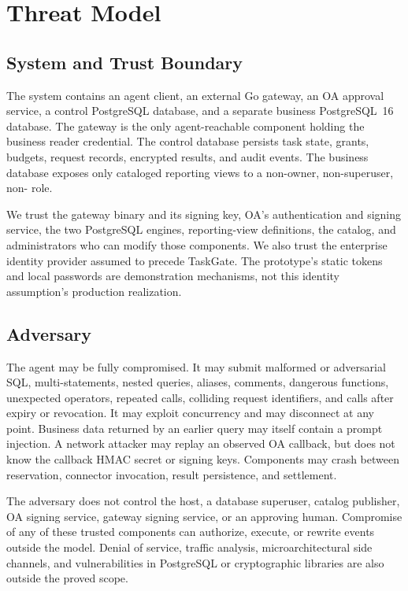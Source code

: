\documentclass[10pt,journal,compsoc]{IEEEtran}
\newcommand{\system}{TaskGate\xspace}
\newcommand{\code}[1]{\texttt{\detokenize{#1}}}
\begin{document}
\section{Threat Model}
\label{sec:threat}

\subsection{System and Trust Boundary}

The system contains an agent client, an external Go gateway, an OA approval
service, a control PostgreSQL database, and a separate business PostgreSQL~16
database.  The gateway is the only agent-reachable component holding the
business reader credential.  The control database persists task state, grants,
budgets, request records, encrypted results, and audit events.  The business
database exposes only cataloged reporting views to a non-owner,
non-superuser, non-\code{BYPASSRLS} role.

We trust the gateway binary and its signing key, OA's authentication and signing
service, the two PostgreSQL engines, reporting-view definitions, the catalog,
and administrators who can modify those components.  We also trust the
enterprise identity provider assumed to precede \system.  The prototype's
static tokens and local passwords are demonstration mechanisms, not this
identity assumption's production realization.

\subsection{Adversary}

The agent may be fully compromised.  It may submit malformed or adversarial
SQL, multi-statements, nested queries, aliases, comments, dangerous functions,
unexpected operators, repeated calls, colliding request identifiers, and calls
after expiry or revocation.  It may exploit concurrency and may disconnect at
any point.  Business data returned by an earlier query may itself contain a
prompt injection.  A network attacker may replay an observed OA callback, but
does not know the callback HMAC secret or signing keys.  Components may crash
between reservation, connector invocation, result persistence, and settlement.

The adversary does not control the host, a database superuser, catalog
publisher, OA signing service, gateway signing service, or an approving human.
Compromise of any of these trusted components can authorize, execute, or rewrite
events outside the model.  Denial of service, traffic analysis, microarchitectural
side channels, and vulnerabilities in PostgreSQL or cryptographic libraries are
also outside the proved scope.
\end{document}
